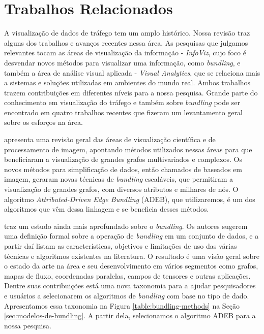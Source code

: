 \chapter{Trabalhos Relacionados}
\label{cap:trabalhos-relacionados}

  A visualização de dados de tráfego tem um amplo histórico. Nossa revisão traz
alguns dos trabalhos e avanços recentes nessa área. As pesquisas que julgamos
relevantes tocam as áreas de visualização da informação - \emph{InfoViz}, cujo
foco é desvendar novos métodos para visualizar uma informação, como
\emph{bundling}, e também a área de análise visual aplicada - \emph{Visual
Analytics}, que se relaciona mais a sistemas e soluções utilizadas em ambientes
do mundo real. Ambos trabalhos trazem contribuições em diferentes níveis para a
nossa pesquisa. Grande parte do conhecimento em visualização do tráfego e
também sobre \emph{bundling} pode ser encontrado em quatro trabalhos recentes
que fizeram um levantamento geral sobre os esforços na área.

  \citet{Telea2018} apresenta uma revisão geral das áreas de visualização
científica e de processamento de imagem, apontando métodos utilizados nessas
áreas para que beneficiaram a visualização de grandes grafos multivariados e
complexos. Os novos métodos para simplificação de dados, então chamados de
baseados em imagem, geraram novas técnicas de \emph{bundling} escaláveis, que
permitiram a visualização de grandes grafos, com diversos atributos e
milhares de nós. O algoritmo \emph{Attributed-Driven Edge Bundling} (ADEB), que utilizaremos,
é um dos algoritmos que vêm dessa linhagem e se beneficia desses métodos. 

  \citet{Lhuillier2017} traz um estudo ainda mais aprofundado sobre o
\emph{bundling}. Os autores sugerem uma definição formal sobre a operação de
\emph{bundling} em um conjunto de dados, e a partir daí listam as características,
objetivos e limitações de uso das várias técnicas e algoritmos
existentes na literatura. O resultado é uma visão geral sobre o estado da arte na área
e seu desenvolvimento em vários segmentos como grafos, mapas de fluxo,
coordenadas paralelas, campos de tensores e outras aplicações. Dentre suas
contribuições está uma nova taxonomia para a ajudar pesquisadores e usuários a
selecionarem os algoritmos de \emph{bundling} com base no tipo de dado.
Apresentamos essa taxonomia na Figura \ref{table:bundling-methods} na Seção
\ref{sec:modelos-de-bundling}. A partir dela, selecionamos o algoritmo ADEB
para a nossa pesquisa.

